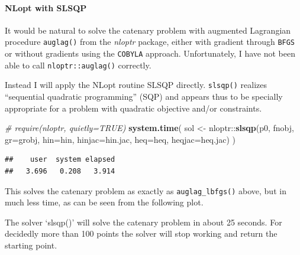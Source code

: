 \documentclass[]{article}
\newenvironment{Shaded}{\begin{snugshade}}{\end{snugshade}}
\newcommand{\KeywordTok}[1]{\textcolor[rgb]{0.13,0.29,0.53}{\textbf{{#1}}}}
\newcommand{\DataTypeTok}[1]{\textcolor[rgb]{0.13,0.29,0.53}{{#1}}}
\newcommand{\StringTok}[1]{\textcolor[rgb]{0.31,0.60,0.02}{{#1}}}
\newcommand{\CommentTok}[1]{\textcolor[rgb]{0.56,0.35,0.01}{\textit{{#1}}}}
\newcommand{\NormalTok}[1]{{#1}}
\let\oldparagraph\paragraph
\renewcommand{\paragraph}[1]{\oldparagraph{#1}\mbox{}}
\begin{document}
\paragraph{NLopt with SLSQP}\label{nlopt-with-slsqp}

It would be natural to solve the catenary problem with augmented
Lagrangian procedure \texttt{auglag()} from the \emph{nloptr} package,
either with gradient through \texttt{BFGS} or without gradients using
the \texttt{COBYLA} approach. Unfortunately, I have not been able to
call \texttt{nloptr::auglag()} correctly.

Instead I will apply the NLopt routine SLSQP directly. \texttt{slsqp()}
realizes ``sequential quadratic programming'' (SQP) and appears thus to
be specially appropriate for a problem with quadratic objective and/or
constraints.

\begin{Shaded}
\begin{Highlighting}[]
\CommentTok{# require(nloptr, quietly=TRUE)}
\KeywordTok{system.time}\NormalTok{(}
\NormalTok{sol <-}\StringTok{ }\NormalTok{nloptr::}\KeywordTok{slsqp}\NormalTok{(p0, fnobj, }\DataTypeTok{gr=}\NormalTok{grobj,}
                     \DataTypeTok{hin=}\NormalTok{hin, }\DataTypeTok{hinjac=}\NormalTok{hin.jac,}
                     \DataTypeTok{heq=}\NormalTok{heq, }\DataTypeTok{heqjac=}\NormalTok{heq.jac)}
\NormalTok{)}
\end{Highlighting}
\end{Shaded}

\begin{verbatim}
##    user  system elapsed 
##   3.696   0.208   3.914
\end{verbatim}

This solves the catenary problem as exactly as \texttt{auglag\_lbfgs()}
above, but in much less time, as can be seen from the following plot.

The solver `slsqp()' will solve the catenary problem in about 25
seconds. For decidedly more than 100 points the solver will stop working
and return the starting point.
\end{document}
